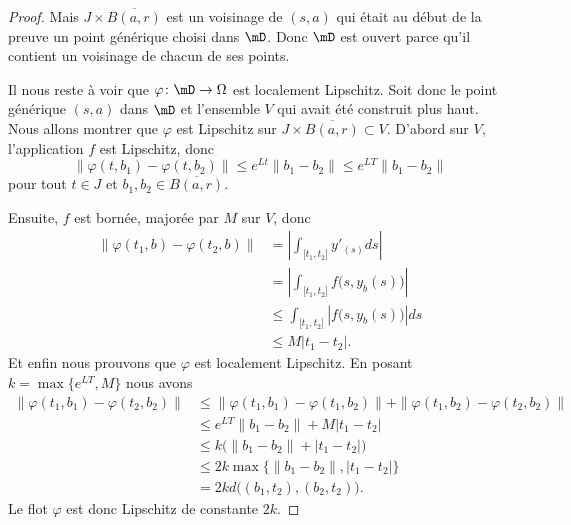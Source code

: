\begin{proof}
    Mais \( J\times \overline{ B(a,r) }\) est un voisinage de \( (s,a)\) qui était au début de la preuve un point générique choisi dans \( \mD\). Donc \( \mD\) est ouvert parce qu'il contient un voisinage de chacun de ses points.

    Il nous reste à voir que \( \varphi\colon \mD\to \Omega\) est localement Lipschitz. Soit donc le point générique \( (s,a)\) dans \( \mD\) et l'ensemble $V$ qui avait été construit plus haut. Nous allons montrer que \( \varphi\) est Lipschitz sur \( J\times \overline{ B(a,r) }\subset V\). D'abord sur \( V\), l'application \( f\) est Lipschitz, donc
    \begin{equation}
            \| \varphi(t,b_1)-\varphi(t,b_2) \|\leq  e^{Lt}\| b_1-b_2 \|
            \leq  e^{LT}\| b_1-b_2 \|
    \end{equation}
    pour tout \( t\in J\) et \( b_1,b_2\in \overline{ B(a,r) }\).

    Ensuite, \( f\) est bornée, majorée par \( M\) sur $V$, donc
    \begin{subequations}
        \begin{align}
            \| \varphi(t_1,b)-\varphi(t_2,b) \|&=| \int_{\mathopen[ t_1 , t_2 \mathclose]} y'_(s)ds |\\
            &=| \int_{\mathopen[ t_1 , t_2 \mathclose]}f\big( s,y_b(s) \big) |\\
            &\leq \int_{\mathopen[ t_1 , t_2 \mathclose]}| f\big( s,y_b(s) \big) |ds\\
            &\leq M| t_1-t_2 |.
        \end{align}
    \end{subequations}
    Et enfin nous prouvons que \( \varphi\) est localement Lipschitz. En posant \( k=\max\{  e^{LT},M \}\) nous avons
    \begin{subequations}
        \begin{align}
            \| \varphi(t_1,b_1)-\varphi(t_2,b_2) \|&\leq \| \varphi(t_1,b_1)-\varphi(t_1,b_2) \|+\| \varphi(t_1,b_2)-\varphi(t_2,b_2) \|\\
            &\leq  e^{LT}\| b_1-b_2 \|+M| t_1-t_2 |\\
            &\leq k\big( \| b_1-b_2 \|+| t_1-t_2 | \big)\\
            &\leq 2k\max\{ \| b_1-b_2 \|,| t_1-t_2 | \}\\
            &=2kd\big(  (b_1,t_2),(b_2,t_2)  \big).
        \end{align}
    \end{subequations}
    Le flot \( \varphi\) est donc Lipschitz de constante \( 2k\).
\end{proof} 

